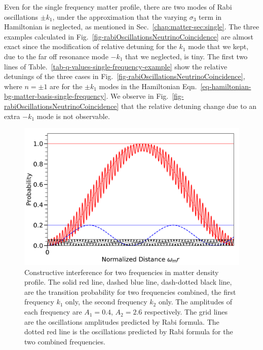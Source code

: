 Even for the single frequency matter profile, there are two modes of Rabi oscillations $\pm k_1$, under the approximation that the varying $\sigma_3$ term in Hamiltonian is neglected, as mentioned in Sec.~\ref{chap:matter-sec:single}. The three examples calculated in Fig.~\ref{fig-rabiOscillationsNeutrinoCoincidence} are almost exact since the modification of relative detuning for the $k_1$ mode that we kept, due to the far off resonance mode $-k_1$ that we neglected, is tiny. The first two lines of Table.~\ref{tab-q-values-single-frequency-example} show the relative detunings of the three cases in Fig.~\ref{fig-rabiOscillationsNeutrinoCoincidence}, where $n=\pm 1$ are for the $\pm k_1$ modes in the Hamiltonian Eqn.~\ref{eq-hamiltonian-bg-matter-basis-single-frequency}. We observe in Fig.~\ref{fig-rabiOscillationsNeutrinoCoincidence} that the relative detuning change due to an extra $-k_1$ mode is not observable.


\begin{figure}[!htbp]
    \centering
    \includegraphics[width=\textwidth]{chapters/assets/rabi/rabiOscillationsNeutrinoCoincidence-two-frequencies-constructive.pdf}
    \caption{Constructive interference for two frequencies in matter density profile. The solid red line, dashed blue line, dash-dotted black line, are the transition probability for two frequencies combined, the first frequency $k_1$ only, the second frequency $k_2$ only. The amplitudes of each frequency are $A_1=0.4$, $A_2=2.6$ respectively. The grid lines are the oscillations amplitudes predicted by Rabi formula. The dotted red line is the oscillations predicted by Rabi formula for the two combined frequencies.}
    \label{chap:matter-sec:constructive-fig:two-frequencies-constructive}
\end{figure}

